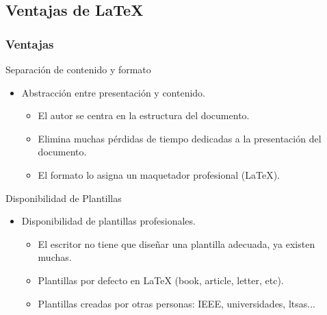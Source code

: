 \documentclass[aspectratio=1610]{beamer}%
\begin{document}
\subsection{Ventajas de \LaTeX{}}
\begin{frame}[fragile]
\frametitle{\textbf{Ventajas}}
\justifying
 \begin{block}{Separación de contenido y formato}
\begin{itemize}\justifying
  \item Abstracción entre presentación y contenido.
  \begin{itemize}\justifying
  \item El autor se centra en la estructura del documento.
  \item Elimina muchas pérdidas de tiempo dedicadas a la presentación del documento.
  \item El formato lo asigna un maquetador profesional (\LaTeX{}).
\end{itemize}

\end{itemize}

\end{block}

\begin{block}{Disponibilidad de Plantillas}
\begin{itemize}\justifying
  \item Disponibilidad de plantillas profesionales.
  \begin{itemize}\justifying
  \item El escritor no tiene que diseñar una plantilla adecuada, ya existen muchas.
  \item Plantillas por defecto en \LaTeX{} (book, article, letter, etc).
  \item Plantillas creadas por otras personas: IEEE, universidades, ltsas...
\end{itemize}

\end{itemize}

\end{block}
\end{frame}
\end{document}
